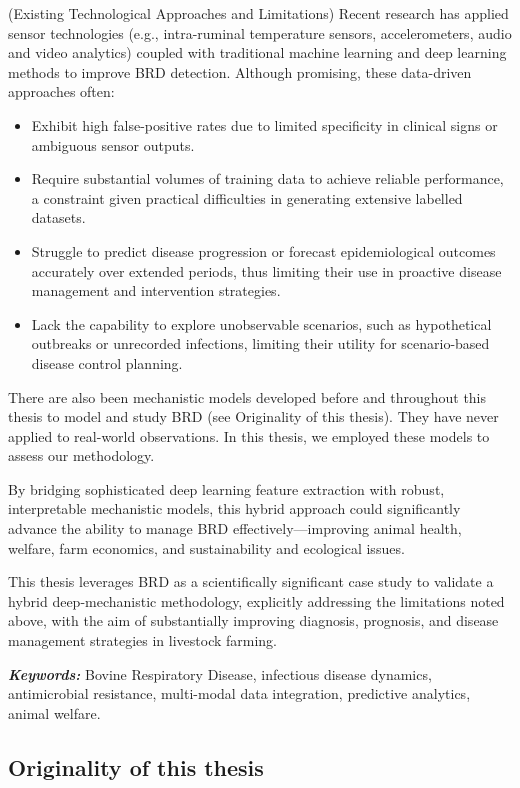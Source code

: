 (Existing Technological Approaches and Limitations) Recent research has applied sensor technologies (e.g., intra-ruminal temperature sensors, accelerometers, audio and video analytics) coupled with traditional machine learning and deep learning methods to improve BRD detection. Although promising, these data-driven approaches often:
\begin{itemize}
    \item Exhibit high false-positive rates due to limited specificity in clinical signs or ambiguous sensor outputs.
    \item Require substantial volumes of training data to achieve reliable performance, a constraint given practical difficulties in generating extensive labelled datasets.
    \item Struggle to predict disease progression or forecast epidemiological outcomes accurately over extended periods, thus limiting their use in proactive disease management and intervention strategies.
    \item Lack the capability to explore unobservable scenarios, such as hypothetical outbreaks or unrecorded infections, limiting their utility for scenario-based disease control planning.
\end{itemize}

There are also been mechanistic models developed before and throughout this thesis to model and study BRD (see Originality of this thesis). They have never applied to real-world observations. In this thesis, we employed these models to assess our methodology.

By bridging sophisticated deep learning feature extraction with robust, interpretable mechanistic models, this hybrid approach could significantly advance the ability to manage BRD effectively—improving animal health, welfare, farm economics, and sustainability and ecological issues. 

This thesis leverages BRD as a scientifically significant case study to validate a hybrid deep-mechanistic methodology, explicitly addressing the limitations noted above, with the aim of substantially improving diagnosis, prognosis, and disease management strategies in livestock farming.

\textit{\textbf{Keywords:}} Bovine Respiratory Disease, infectious disease dynamics, antimicrobial resistance, multi-modal data integration, predictive analytics, animal welfare.


\subsection{Originality of this thesis}


